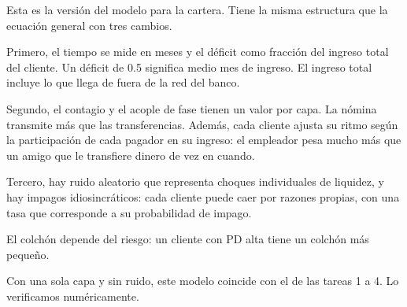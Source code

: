 \begin{decir}
Esta es la versión del modelo para la cartera. Tiene la misma estructura que la ecuación
general con tres cambios.

Primero, el tiempo se mide en meses y el déficit como fracción del ingreso total del
cliente. Un déficit de 0.5 significa medio mes de ingreso. El ingreso total incluye lo que
llega de fuera de la red del banco.

Segundo, el contagio y el acople de fase tienen un valor por capa. La nómina transmite
más que las transferencias. Además, cada cliente ajusta su ritmo según la participación
de cada pagador en su ingreso: el empleador pesa mucho más que un amigo que le transfiere
dinero de vez en cuando.

Tercero, hay ruido aleatorio que representa choques individuales de liquidez, y hay
impagos idiosincráticos: cada cliente puede caer por razones propias, con una tasa que
corresponde a su probabilidad de impago.

El colchón depende del riesgo: un cliente con PD alta tiene un colchón más pequeño.

Con una sola capa y sin ruido, este modelo coincide con el de las tareas 1 a 4. Lo
verificamos numéricamente.
\end{decir}
